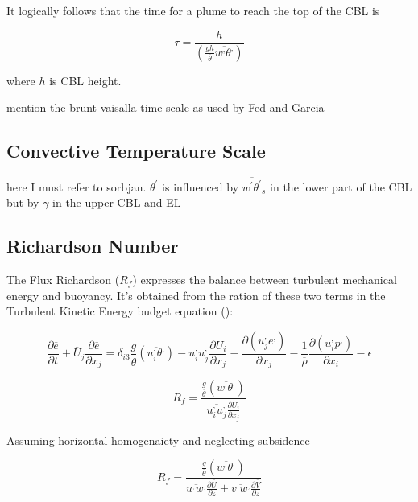 It logically follows that the time for a plume to reach the top of the \acs{CBL} is

\begin{equation}
\tau = \frac{h}{\left( \frac{gh}{\overline{\theta}}\overline{w^{,}\theta^{,}} \right)}
\end{equation}

where $h$ is \acs{CBL} height.

mention the brunt vaisalla time scale as used by Fed and Garcia

\subsection{Convective Temperature Scale}
\label{}

here I must refer to sorbjan.  $\theta^{'}$ is influenced by $\overline{w^{'}\theta^{'}}_{s}$
in the lower part of the \acs{CBL} but by $\gamma$ in the upper \acs{CBL} and \acs{EL}

\subsection{Richardson Number}
\label{}

The Flux Richardson ($R_{f}$) expresses the balance between turbulent mechanical energy and buoyancy.  It's obtained from the ration of these two terms
 in the Turbulent Kinetic Energy budget equation (\cite{Stull-BLMetIntro}):

\begin{equation}
\frac{\partial \overline{e}}{\partial t} + \overline{U}_{j} \frac{\partial \overline{e}}{\partial x_{j}} = \delta_{i3}  \frac{g}{\overline{\theta}} \left( \overline{u_{i}^{,}\theta^{,}} \right) - \overline{u_{i}^{,}u_{j}^{,}}\frac{\partial \overline{U}_{i}}{\partial x_{j}} - \frac{ \partial \left( u_{j}^{,}e^{,} \right)}{\partial x_{j}} - \frac{1}{\overline{\rho}} \frac{\partial \left( u_{i}^{,} p^{,} \right) }{\partial x_{i}} - \epsilon
\end{equation}

\begin{equation}
R_{f} = \frac{\frac{g}{\overline{\theta}} \left( \overline{w^{,}\theta^{,}} \right)}{\overline{u_{i}^{,}u_{j}^{,}}\frac{\partial \overline{U}_{i}}{\partial x_{j}}}
\end{equation}
 
Assuming horizontal homogenaiety and neglecting subsidence
  
\begin{equation}
R_{f} = \frac{\frac{g}{\overline{\theta}} \left( \overline{w^{,}\theta^{,}} \right)}{\overline{u^{,}w^{,}}\frac{\partial \overline{U}}{\partial z} + \overline{v^{,}w^{,}}\frac{\partial \overline{V}}{\partial z}}
\end{equation}

